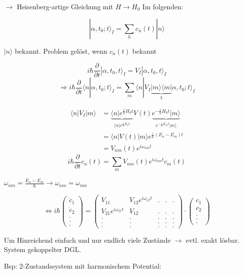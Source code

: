 \(\rightarrow\) Heisenberg-artige Gleichung mit \(H\rightarrow H_0\) Im folgenden:

\[ |\alpha,t_0;t\rangle_I = \sum_h c_n(t)|n\rangle\]

\(|n\rangle\) bekannt. Problem gelöst, wenn \(c_n(t)\) bekannt

\[ i\hbar \frac{\partial}{\partial t}|\alpha,t_0,t\rangle_I = V_I|\alpha,t_0,t\rangle_I\]
\[\Rightarrow i\hbar\frac{\partial}{\partial t}\langle n|\alpha,t_0;t\rangle_I = \sum_m \langle n|V_I\underbrace{|m\rangle\langle m|}_{\mathbb 1}\alpha,t_0;t\rangle_I\]

\begin{align}
\langle n|V_I|m\rangle &= \underbrace{\langle n | e^{\frac{i}{\hbar}H_0t}}_{\langle n|e^{\frac{i}{\hbar}E_nt}}V(t)\underbrace{e^{-\frac{i}{\hbar}H_0t}|m\rangle}_{e^{-\frac{i}{\hbar}E_mt}|m\rangle } \\
& = \langle n|V(t)|m\rangle e^{\frac{i}{\hbar}(E_n-E_m)t} \\
&= V_{nm}(t) e^{i\omega_{nm} t}
\end{align}
\[\boxed{i\hbar \frac{\partial}{\partial t}c_n(t) = \sum_m V_{nm}(t) e^{i\omega_{nm}t}c_m(t)}\]

\(\omega_{nm}=\frac{E_n-E_m}{\hbar}\rightarrow \omega_{nm}=\omega_{mn}\)

\[\Leftrightarrow i\hbar \begin{pmatrix}\dot c_1\\\dot c_2\\.\\.\\.\end{pmatrix} =\begin{pmatrix}V_{11}&V_{12}e^{i\omega_{12}t}&.&.&.\\
  V_{21}e^{i\omega_{21}t}&V_{12}&.&.&.\\
  .&.&.&.&.\\
  .&.&.&.&.\\
  .&.&.&.&.
\end{pmatrix}\cdot\begin{pmatrix}c_1\\c_2\\.\\.\\.\end{pmatrix}\]

Um Hinreichend einfach und nur endlich viele Zustände \(\rightarrow\) evtl. exakt lösbar. System gekoppelter DGL.


Bsp: 2-Zustandssystem mit harmonischem Potential:


